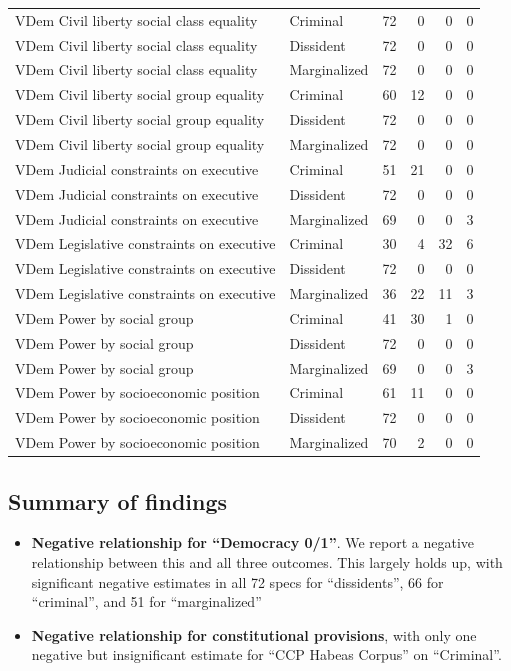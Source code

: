 \documentclass[]{article}
\providecommand{\tightlist}{%
  \setlength{\itemsep}{0pt}\setlength{\parskip}{0pt}}
\begin{document}
\begin{table}[t]
\begin{tabular}{llrrrr}
VDem Civil liberty social class equality & Criminal & 72 & 0 & 0 & 0\\
\addlinespace
VDem Civil liberty social class equality & Dissident & 72 & 0 & 0 & 0\\
VDem Civil liberty social class equality & Marginalized & 72 & 0 & 0 & 0\\
VDem Civil liberty social group equality & Criminal & 60 & 12 & 0 & 0\\
VDem Civil liberty social group equality & Dissident & 72 & 0 & 0 & 0\\
VDem Civil liberty social group equality & Marginalized & 72 & 0 & 0 & 0\\
\addlinespace
VDem Judicial constraints on executive & Criminal & 51 & 21 & 0 & 0\\
VDem Judicial constraints on executive & Dissident & 72 & 0 & 0 & 0\\
VDem Judicial constraints on executive & Marginalized & 69 & 0 & 0 & 3\\
VDem Legislative constraints on executive & Criminal & 30 & 4 & 32 & 6\\
VDem Legislative constraints on executive & Dissident & 72 & 0 & 0 & 0\\
\addlinespace
VDem Legislative constraints on executive & Marginalized & 36 & 22 & 11 & 3\\
VDem Power by social group & Criminal & 41 & 30 & 1 & 0\\
VDem Power by social group & Dissident & 72 & 0 & 0 & 0\\
VDem Power by social group & Marginalized & 69 & 0 & 0 & 3\\
VDem Power by socioeconomic position & Criminal & 61 & 11 & 0 & 0\\
\addlinespace
VDem Power by socioeconomic position & Dissident & 72 & 0 & 0 & 0\\
VDem Power by socioeconomic position & Marginalized & 70 & 2 & 0 & 0\\
\bottomrule
\end{tabular}
\end{table}

\hypertarget{summary-of-findings}{%
\subsection{Summary of findings}\label{summary-of-findings}}

\begin{itemize}
\tightlist
\item
  \textbf{Negative relationship for ``Democracy 0/1''}. We report a
  negative relationship between this and all three outcomes. This
  largely holds up, with significant negative estimates in all 72 specs
  for ``dissidents'', 66 for ``criminal'', and 51 for ``marginalized''
\item
  \textbf{Negative relationship for constitutional provisions}, with
  only one negative but insignificant estimate for ``CCP Habeas Corpus''
  on ``Criminal''.
\end{itemize}
\end{document}
